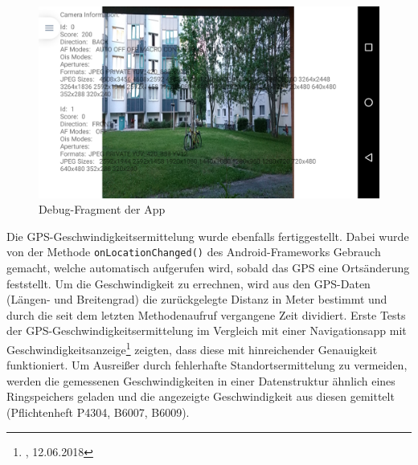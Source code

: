 \documentclass[12pt,a4paper,ngerman,enabledeprecatedfontcommands]{scrreprt}
\begin{document}
\begin{figure}[H]
\centering
\includegraphics[width=0.9\linewidth]{Reviewdokument/Grafiken/app_debug_screenshot.png}
\caption{Debug-Fragment der App}
\label{fig:debug_ui}
\end{figure}

Die GPS-Geschwindigkeitsermittelung wurde ebenfalls fertiggestellt. Dabei wurde von der Methode \texttt{onLocationChanged()} des Android-Frameworks Gebrauch gemacht, welche automatisch aufgerufen wird, sobald das GPS eine Ortsänderung feststellt. Um die Geschwindigkeit zu errechnen, wird aus den GPS-Daten (Längen- und Breitengrad) die zurückgelegte Distanz in Meter bestimmt und durch die seit dem letzten Methodenaufruf vergangene Zeit dividiert. Erste Tests der GPS-Geschwindigkeitsermittelung im Vergleich mit einer Navigationsapp mit Geschwindigkeitsanzeige\footnote{, 12.06.2018} zeigten, dass diese mit hinreichender Genauigkeit funktioniert. Um Ausreißer durch fehlerhafte Standortsermittelung zu vermeiden, werden die gemessenen Geschwindigkeiten in einer Datenstruktur ähnlich eines Ringspeichers geladen und die angezeigte Geschwindigkeit aus diesen gemittelt (Pflichtenheft P4304, B6007, B6009).\\
\end{document}

